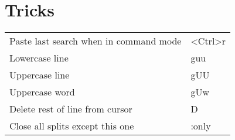 \documentclass[a4paper]{report}
\def \tablewidth {10cm}
\begin{document}
\section{Tricks}
\begin{tabularx}{\tablewidth}{| X | l |}
  \hline
  Paste last search when in command mode & \textless Ctrl\textgreater r \\
  Lowercase line & guu \\
  Uppercase line & gUU \\
  Uppercase word & gUw \\
  Delete rest of line from cursor & D \\
  Close all splits except this one & :only \\
  \hline
\end{tabularx}
\end{document}
